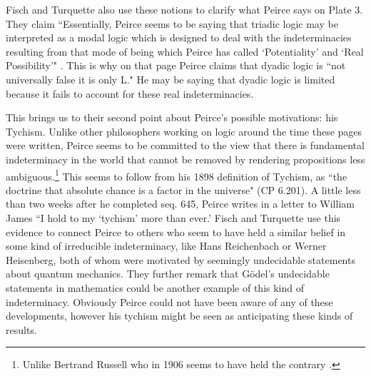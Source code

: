 \documentclass[12pt]{article}
\begin{document}
Fisch and Turquette also use these notions to clarify what Peirce says on Plate 3. They claim ``Essentially, Peirce seems to be saying that triadic logic may be interpreted as a modal logic which is designed to deal with the indeterminacies resulting from that mode of being which Peirce has called `Potentiality' and `Real Possibility'" \citep{fisch1966peirce}. This is why on that page Peirce claims that dyadic logic is ``not universally false it is only L." He may be saying that dyadic logic is limited because it fails to account for these real indeterminacies.

This brings us to their second point about Peirce's possible motivations: his Tychism. Unlike other philosophers working on logic around the time these pages were written, Peirce seems to be committed to the view that there is fundamental indeterminacy in the world that cannot be removed by rendering propositions less ambiguous.\footnote{Unlike Bertrand Russell who in 1906 seems to have held the contrary \citep{10.2307/2248563}.} This seems to follow from his 1898 definition of Tychism, as ``the doctrine that absolute chance is a factor in the universe" (CP 6.201). A little less than two weeks after he completed seq. 645, Peirce writes in a letter to William James ``I hold to my `tychism' more than ever.' Fisch and Turquette use this evidence to connect Peirce to others who seem to have held a similar belief in some kind of irreducible indeterminacy, like Hans Reichenbach or Werner Heisenberg, both of whom were motivated by seemingly undecidable statements about quantum mechanics. They further remark that Gödel's undecidable statements in mathematics could be another example of this kind of indeterminacy. Obviously Peirce could not have been aware of any of these developments, however his tychism might be seen as anticipating these kinds of results.
\end{document}
